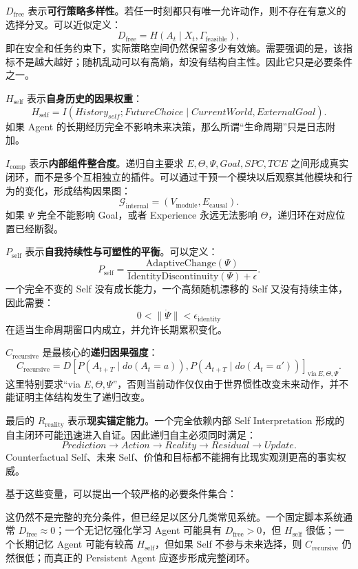 $D_{\mathrm{free}}$ 表示\textbf{可行策略多样性}。若任一时刻都只有唯一允许动作，则不存在有意义的选择分叉。可以近似定义：
\[
D_{\mathrm{free}}
=
H(
A_t
\mid
X_t,\Gamma_{\mathrm{feasible}}
),
\]
即在安全和任务约束下，实际策略空间仍然保留多少有效熵。需要强调的是，该指标不是越大越好；随机乱动可以有高熵，却没有结构自主性。因此它只是必要条件之一。

$H_{\mathrm{self}}$ 表示\textbf{自身历史的因果权重}：
\[
H_{\mathrm{self}}
=
I(
History_{self};
FutureChoice
\mid
CurrentWorld,ExternalGoal
).
\]
如果 Agent 的长期经历完全不影响未来决策，那么所谓“生命周期”只是日志附加。

$I_{\mathrm{comp}}$ 表示\textbf{内部组件整合度}。递归自主要求 $E,\Theta,\Psi,Goal,SPC,TCE$ 之间形成真实闭环，而不是多个互相独立的插件。可以通过干预一个模块以后观察其他模块和行为的变化，形成结构因果图：
\[
\mathcal G_{\mathrm{internal}}
=
(V_{\mathrm{module}},E_{\mathrm{causal}}).
\]
如果 $\Psi$ 完全不能影响 Goal，或者 Experience 永远无法影响 $\Theta$，递归环在对应位置已经断裂。

$P_{\mathrm{self}}$ 表示\textbf{自我持续性与可塑性的平衡}。可以定义：
\[
P_{\mathrm{self}}
=
\frac{
\mathrm{AdaptiveChange}(\Psi)
}{
\mathrm{IdentityDiscontinuity}(\Psi)+\epsilon
}.
\]
一个完全不变的 Self 没有成长能力，一个高频随机漂移的 Self 又没有持续主体，因此需要：
\[
0<
\|\dot\Psi\|
<
\epsilon_{\mathrm{identity}}
\]
在适当生命周期窗口内成立，并允许长期累积变化。

$C_{\mathrm{recursive}}$ 是最核心的\textbf{递归因果强度}：
\[
C_{\mathrm{recursive}}
=
D
\left[
P(A_{t+T}\mid do(A_t=a)),
P(A_{t+T}\mid do(A_t=a'))
\right]_{\mathrm{via}\ E,\Theta,\Psi}.
\]
这里特别要求“via $E,\Theta,\Psi$”，否则当前动作仅仅由于世界惯性改变未来动作，并不能证明主体结构发生了递归改变。

最后的 $R_{\mathrm{reality}}$ 表示\textbf{现实锚定能力}。一个完全依赖内部 Self Interpretation 形成的自主闭环可能迅速进入自证。因此递归自主必须同时满足：
\[
Prediction
\rightarrow
Action
\rightarrow
Reality
\rightarrow
Residual
\rightarrow
Update.
\]
Counterfactual Self、未来 Self、价值和目标都不能拥有比现实观测更高的事实权威。

基于这些变量，可以提出一个较严格的必要条件集合：
\begin{statementbox}
\centering
{}
\end{statementbox}
这仍然不是完整的充分条件，但已经足以区分几类常见系统。一个固定脚本系统通常 $D_{\mathrm{free}}\approx0$；一个无记忆强化学习 Agent 可能具有 $D_{\mathrm{free}}>0$，但 $H_{\mathrm{self}}$ 很低；一个长期记忆 Agent 可能有较高 $H_{\mathrm{self}}$，但如果 Self 不参与未来选择，则 $C_{\mathrm{recursive}}$ 仍然很低；而真正的 Persistent Agent 应逐步形成完整闭环。


